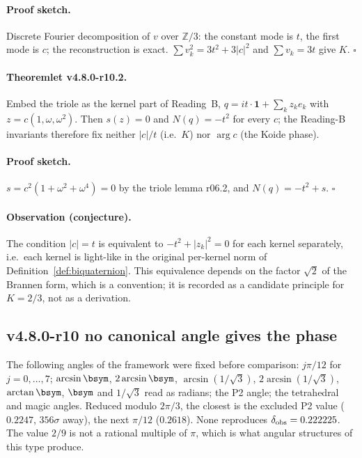 \paragraph{Proof sketch.}
Discrete Fourier decomposition of \(v\) over \(\mathbb Z/3\): the constant mode is \(t\), the first mode
is \(c\); the reconstruction is exact.  \(\sum v_k^2=3t^2+3|c|^2\) and \(\sum v_k=3t\) give \(K\).
\(\square\)

\paragraph{Theoremlet v4.8.0-r10.2.}
Embed the triole as the kernel part of Reading~B, \(q=it\cdot\mathbf 1+\sum_k z_ke_k\) with
\(z=c(1,\omega,\omega^2)\).  Then \(s(z)=0\) and \(N(q)=-t^2\) for every \(c\); the Reading-B invariants
therefore fix neither \(|c|/t\) (i.e.\ \(K\)) nor \(\arg c\) (the Koide phase).

\paragraph{Proof sketch.}
\(s=c^2(1+\omega^2+\omega^4)=0\) by the triole lemma r06.2, and \(N(q)=-t^2+s\).  \(\square\)

\paragraph{Observation (conjecture).}
The condition \(|c|=t\) is equivalent to \(-t^2+|z_k|^2=0\) for each kernel separately, i.e.\ each
kernel is light-like in the original per-kernel norm of Definition~\ref{def:biquaternion}.  This
equivalence depends on the factor \(\sqrt2\) of the Brannen form, which is a convention; it is
recorded as a candidate principle for \(K=2/3\), not as a derivation.

\subsection*{v4.8.0-r10 no canonical angle gives the phase}
\label{subsec:v480-r10-phase}

The following angles of the framework were fixed before comparison: \(j\pi/12\) for \(j=0,\dots,7\);
\(\arcsin\bsym\), \(2\arcsin\bsym\), \(\arcsin(1/\sqrt3)\), \(2\arcsin(1/\sqrt3)\), \(\arctan\bsym\),
\(\bsym\) and \(1/\sqrt3\) read as radians; the P2 angle; the tetrahedral and magic angles.  Reduced
modulo \(2\pi/3\), the closest is the excluded P2 value (\(0.2247\), \(356\sigma\) away), the next
\(\pi/12\) (\(0.2618\)).  None reproduces \(\delta_{\rm obs}=0.222225\).  The value \(2/9\) is not a
rational multiple of \(\pi\), which is what angular structures of this type produce.

